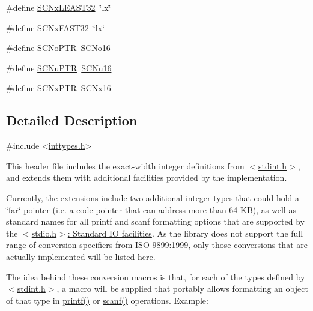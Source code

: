 \begin{DoxyCompactItemize}
\item 
\#define \hyperlink{group__avr__inttypes_gabd82b99090a28a84541959ac7ab14ad9}{S\+C\+Nx\+L\+E\+A\+S\+T32}~\char`\"{}lx\char`\"{}
\item 
\#define \hyperlink{group__avr__inttypes_gac45f394be3c199938a85a631711ce22e}{S\+C\+Nx\+F\+A\+S\+T32}~\char`\"{}lx\char`\"{}
\item 
\#define \hyperlink{group__avr__inttypes_ga4a30d36e06018d8e13046079098905a0}{S\+C\+No\+P\+TR}~\hyperlink{group__avr__inttypes_ga9bc6b517c0117327e832824ff2d6a6b5}{S\+C\+No16}
\item 
\#define \hyperlink{group__avr__inttypes_gab7dbf5d0ea41679dface5855896e4273}{S\+C\+Nu\+P\+TR}~\hyperlink{group__avr__inttypes_ga37bbde0e3f124b7f482d54adb13b0248}{S\+C\+Nu16}
\item 
\#define \hyperlink{group__avr__inttypes_gaa58d290d968643862aec7a8a56e1c8e9}{S\+C\+Nx\+P\+TR}~\hyperlink{group__avr__inttypes_ga12dbc2ac6a36b893ef1c25c357f90a9f}{S\+C\+Nx16}
\end{DoxyCompactItemize}


\subsection{Detailed Description}

\begin{DoxyCode}
\textcolor{preprocessor}{#include <\hyperlink{inttypes_8h}{inttypes.h}>} 
\end{DoxyCode}


This header file includes the exact-\/width integer definitions from {\ttfamily $<$\hyperlink{stdint_8h}{stdint.\+h}$>$}, and extends them with additional facilities provided by the implementation.

Currently, the extensions include two additional integer types that could hold a \char`\"{}far\char`\"{} pointer (i.\+e. a code pointer that can address more than 64 KB), as well as standard names for all printf and scanf formatting options that are supported by the \hyperlink{group__avr__stdio}{$<$stdio.\+h$>$\+: Standard IO facilities}. As the library does not support the full range of conversion specifiers from I\+SO 9899\+:1999, only those conversions that are actually implemented will be listed here.

The idea behind these conversion macros is that, for each of the types defined by $<$\hyperlink{stdint_8h}{stdint.\+h}$>$, a macro will be supplied that portably allows formatting an object of that type in \hyperlink{group__avr__stdio_ga4c04da4953607fa5fa4d3908fecde449}{printf()} or \hyperlink{group__avr__stdio_ga3f0edc16dcabb5344d59d42cf7682102}{scanf()} operations. Example\+:


